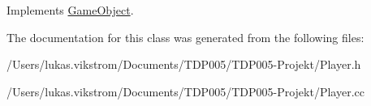Implements \hyperlink{class_game_object}{Game\+Object}.



The documentation for this class was generated from the following files\+:\begin{DoxyCompactItemize}
\item 
/\+Users/lukas.\+vikstrom/\+Documents/\+T\+D\+P005/\+T\+D\+P005-\/\+Projekt/Player.\+h\item 
/\+Users/lukas.\+vikstrom/\+Documents/\+T\+D\+P005/\+T\+D\+P005-\/\+Projekt/Player.\+cc\end{DoxyCompactItemize}
